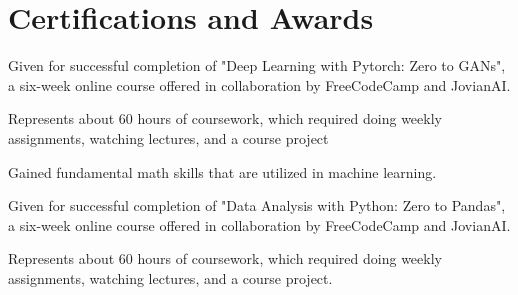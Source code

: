 \documentclass[]{resume-template}
\begin{document}
\begin{minipage}[t]{0.66\textwidth}
\sectionsep{}




\section{Certifications and Awards}\label{sec:certifications-and-awards}

\begin{tightemize}
\item Given for successful completion of "Deep Learning with Pytorch: Zero to GANs",
             a six-week online course offered in collaboration by FreeCodeCamp and JovianAI.
\item Represents about 60 hours of coursework, which required doing weekly assignments, watching lectures, and a course project
\item Gained fundamental math skills that are utilized in machine learning. 
\end{tightemize}
\sectionsep{}

\begin{tightemize}
\item Given for successful completion of "Data Analysis with Python: Zero to Pandas", 
            a six-week online course offered in collaboration by FreeCodeCamp and JovianAI.
\item Represents about 60 hours of coursework, which required doing weekly assignments, watching lectures, and a course project.
\end{tightemize}
\sectionsep{}


\end{minipage}
\end{document}
